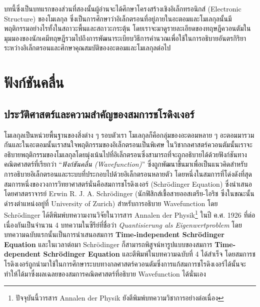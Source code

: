 บทนี้ซึ่งเป็นบทแรกของส่วนที่สองนั้นผู้อ่านจะได้ศึกษาโครงสร้างเชิงอิเล็กทรอนิกส์ (Electronic Structure) ของโมเลกุล ซึ่งเป็นการศึกษาว่าอิเล็กตรอนที่อยู่ภายในอะตอมและโมเลกุลนั้นมีพฤติกรรมอย่างไรทั้งในสถาวะพื้นและสถาวะกระตุ้น โดยเราจะมาดูรายละเอียดของทฤษฎีควอนตัมในมุมมองของนักเคมีทฤษฎีรวมไปถึงการพัฒนาระเบียบวิธีการคำนวณเพื่อใช้ในการอธิบายอันตรกิริยาระหว่างอิเล็กตรอนและศึกษาคุณสมบัติของอะตอมและโมเลกุลต่อไป

\section{ฟังก์ชันคลื่น}
\label{sec:wavefunction}

\subsection{ประวัติศาสตร์และความสำคัญของสมการชโรดิงเงอร์}
\label{ssec:schrodinger_eq}

โมเลกุลเป็นหน่วยพื้นฐานของสิ่งต่าง ๆ รอบตัวเรา โมเลกุลก็คือกลุ่มของอะตอมหลาย ๆ อะตอมมารวมกันและในอะตอมนั้นเราสนใจพฤติกรรมของอิเล็กตรอนเป็นพิเศษ ในวิชากลศาสตร์ควอนตัมนั้นเราจะอธิบายพฤติกรรมของโมเลกุลโดยมุ่งเน้นไปที่อิเล็กตรอนซึ่งสามารถที่จะถูกอธิบายได้ด้วยฟังก์ชันทางคณิตศาสตร์ที่เรียกว่า \enquote{\textit{ฟังก์ชันคลื่น (Wavefunction)}} ซึ่งถูกพัฒนาขึ้นมาเพื่อเป็นแนวคิดสำหรับการอธิบายอิเล็กตรอนและระบบที่ประกอบไปด้วยอิเล็กตรอนหลายตัว โดยหนึ่งในสมการที่โด่งดังที่สุดสมการหนึ่งของวงการวิทยาศาสตร์นั่นคือสมการชโรดิงเงอร์ (Schr\"{o}dinger Equation)\autocite{schleich2013} ซึ่งนำเสนอโดยศาสตราจารย์ Erwin R. J. A. Schr\"{o}dinger (นักฟิสิกส์เชื้อสายออสเตรีย-ไอริช ซึ่งในขณะนั้นดำรงตำแหน่งอยู่ที่ University of Zurich) สำหรับการอธิบาย Wavefunction โดย Schr\"{o}dinger ได้ตีพิมพ์บทความงานวิจัยในวารสาร Annalen der Physik\footnote{ปัจจุบันนี้วารสาร Annalen der Physik ยังตีพิมพ์บทความวิชาการอย่างต่อเนื่อง} ในปี ค.ศ. 1926 ที่ต่อเนื่องกันเป็นจำนวน 4 บทความในซีรีย์ที่ชื่อว่า \textit{Quantisierung als Eigenwertproblem} โดยบทความฉบับแรกนั้นเป็นการนำเสนอสมการ \textbf{Time-independent Schr\"{o}dinger Equation}\autocite{schrodinger1926} และในเวลาต่อมา Schr\"{o}dinger ก็สามารถพิสูจน์หารูปแบบของสมการ \textbf{Time-dependent Schr\"{o}dinger Equation} และตีพิมพ์ในบทความฉบับที่ 4 ได้สำเร็จ\autocite{schrodinger1926a} โดยสมการชโรดิงเงอร์ถูกนำมาใช้ในการศึกษาระบบทางกลศาสตร์ควอนตัมซึ่งการแก้สมการชโรดิงเงอร์ได้นั้นจะทำให้ได้มาซึ่งผลเฉลยของสมการคณิตศาสตร์ที่อธิบาย Wavefunction ได้นั่นเอง

